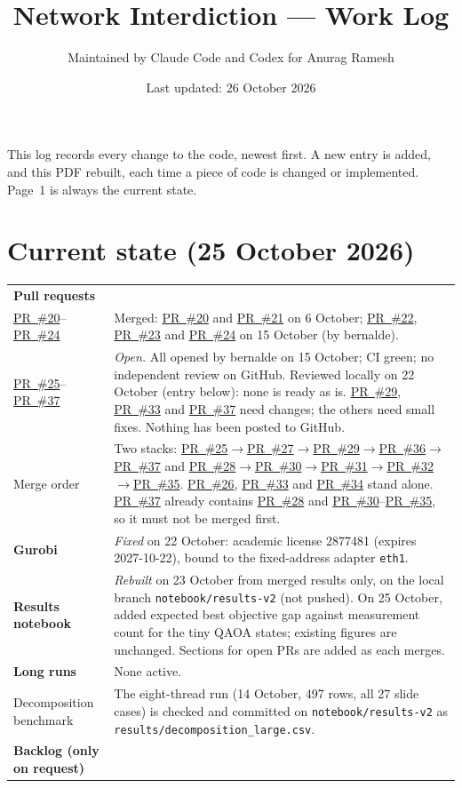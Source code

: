 \documentclass[10.5pt]{article}
\title{Network Interdiction --- Work Log}
\author{Maintained by Claude Code and Codex for Anurag Ramesh}
\date{Last updated: 26 October 2026}
\newcommand{\pr}[1]{\href{https://github.com/anurag-r20/Network-Interdiction/pull/#1}{PR~\##1}}
\newcommand{\f}[1]{\texttt{#1}}
\begin{document}
\maketitle

\noindent This log records every change to the code, newest first. A new
entry is added, and this PDF rebuilt, each time a piece of code is changed or
implemented. Page~1 is always the current state.

\section*{Current state (25 October 2026)}

\begin{tabularx}{\linewidth}{@{}lX@{}}
\toprule
\textbf{Pull requests} & \\
\pr{20}--\pr{24} & Merged: \pr{20} and \pr{21} on 6 October; \pr{22}, \pr{23} and \pr{24} on 15 October (by bernalde). \\
\pr{25}--\pr{37} & \emph{Open.} All opened by bernalde on 15 October; CI green; no independent review on GitHub. Reviewed locally on 22 October (entry below): none is ready as is. \pr{29}, \pr{33} and \pr{37} need changes; the others need small fixes. Nothing has been posted to GitHub. \\
Merge order & Two stacks: \pr{25}$\to$\pr{27}$\to$\pr{29}$\to$\pr{36}$\to$\pr{37} and \pr{28}$\to$\pr{30}$\to$\pr{31}$\to$\pr{32}$\to$\pr{35}. \pr{26}, \pr{33} and \pr{34} stand alone. \pr{37} already contains \pr{28} and \pr{30}--\pr{35}, so it must not be merged first. \\
\midrule
\textbf{Gurobi} & \emph{Fixed} on 22 October: academic license 2877481 (expires 2027-10-22), bound to the fixed-address adapter \f{eth1}. \\
\midrule
\textbf{Results notebook} & \emph{Rebuilt} on 23 October from merged results only, on the local branch \f{notebook/results-v2} (not pushed). On 25 October, added expected best objective gap against measurement count for the tiny QAOA states; existing figures are unchanged. Sections for open PRs are added as each merges. \\
\midrule
\textbf{Long runs} & None active. \\
Decomposition benchmark & The eight-thread run (14 October, 497 rows, all 27 slide cases) is checked and committed on \f{notebook/results-v2} as \f{results/decomposition\_large.csv}. \\
\midrule
\textbf{Backlog (only on request)} & \\

\end{tabularx}
\end{document}
